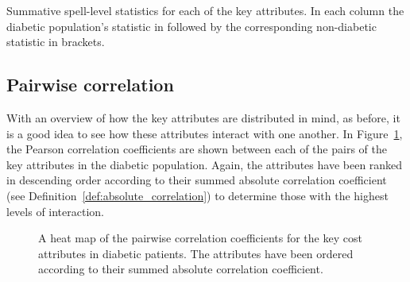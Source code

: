 \begin{table}[htbp]
    \vspace{-40pt}
    \resizebox{\imgwidth}{!}{%
        
    }

    \vspace{3pt}

    \resizebox{\imgwidth}{!}{%
        
    }

    \vspace{3pt}
    
    \resizebox{\imgwidth}{!}{%
        
    }

    \vspace{3pt}

    \resizebox{\imgwidth}{!}{%
        
    }

    \vspace{3pt}

    \resizebox{\imgwidth}{!}{%
        
    }

    \vspace{3pt}

    \resizebox{\imgwidth}{!}{%
        
    }

    \caption{Summative spell-level statistics for each of the key attributes. In
        each column the diabetic population's statistic in followed by the
        corresponding non-diabetic statistic in brackets.}%
    \label{tab:diab_summative}
\end{table}


\subsection{Pairwise correlation}\label{subsec:diab_correlation}

With an overview of how the key attributes are distributed in mind, as before,
it is a good idea to see how these attributes interact with one another. In
Figure~\ref{fig:diab_corr_heatmap}, the Pearson correlation coefficients
are shown between each of the pairs of the key attributes in the diabetic
population. Again, the attributes have been ranked in descending order according
to their summed absolute correlation coefficient (see
Definition~\ref{def:absolute_correlation}) to determine those with the highest
levels of interaction.

\begin{figure}[htbp]
    \caption{A heat map of the pairwise correlation coefficients for the key
        cost attributes in diabetic patients. The attributes have been ordered
        according to their summed absolute correlation coefficient.}%
    \label{fig:diab_corr_heatmap}
\end{figure}

